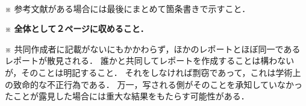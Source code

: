 \documentclass[dvipdfmx,nosetpagesize, uplatex]{jsarticle}
\theoremstyle{definition}
\theoremstyle{StatementsWithStar}
\theoremstyle{StatementsWithStar2}
\theoremstyle{StatementsWithStar3}
\theoremstyle{StatementsWithCCirc}
\theoremstyle{definition}
\begin{document}
\par
\ \par
\noindent
{\small
※ 参考文献がある場合には最後にまとめて箇条書きで示すこと．\par\noindent
※ \textbf{全体として２ページに収めること．}\par\noindent
※ 共同作成者に記載がないにもかかわらず，ほかのレポートとほぼ同一であるレポートが散見される．
誰かと共同してレポートを作成することは構わないが，そのことは明記すること．
それをしなければ剽窃であって，これは学術上の致命的な不正行為である．
万一，写される側がそのことを承知していなかったことが露見した場合には重大な結果をもたらす可能性がある．
}

\par
%
%
\noindent
\end{document}

